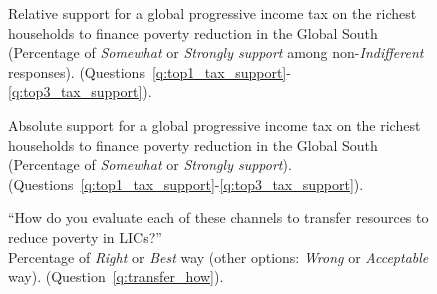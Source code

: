 \begin{figure}[h!]
    \caption[Relative support for a global income tax on the richest to fund LICs]{Relative support for a global progressive income tax on the richest households to finance poverty reduction in the Global South (Percentage of \textit{Somewhat} or \textit{Strongly support} among non-\textit{Indifferent} responses). (Questions~\ref{q:top1_tax_support}-\ref{q:top3_tax_support}).
    }\label{fig:top_tax_share}
\end{figure}

\begin{figure}[h!]
    \caption[Absolute support for an income tax on top 1\% to fund LICs]{Absolute support for a global progressive income tax on the richest households to finance poverty reduction in the Global South (Percentage of \textit{Somewhat} or \textit{Strongly support}). (Questions~\ref{q:top1_tax_support}-\ref{q:top3_tax_support}).
    }\label{fig:top_tax_positive}
\end{figure}

\begin{figure}[h!]
    \caption[\textit{Right} or \textit{Best} way to transfer resources to LICs]{``How do you evaluate each of these channels to transfer resources to reduce poverty in LICs?''\\ Percentage of \textit{Right} or \textit{Best} way (other options: \textit{Wrong} or \textit{Acceptable} way). (Question~\ref{q:transfer_how}).
    }\label{fig:transfer_how_positive}
\end{figure}

